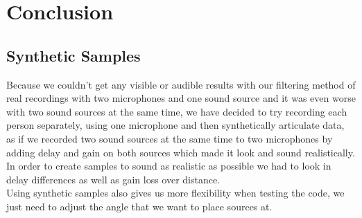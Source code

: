 \chapter{Conclusion}\label{ch:conclusion}

\section{Synthetic Samples}
  Because we couldn't get any visible or audible results with our filtering method of real recordings with two 
microphones and one sound source and it was even worse with two sound sources at the same time, we have 
decided to try recording each person separately, using one microphone and then synthetically articulate data, 
as if we recorded two sound sources at the same time to two microphones by adding delay and gain on both 
sources which made it look and sound realistically.\\
  In order to create samples to sound as realistic as possible we had to look in delay differences as well as 
gain loss over distance. \\
Using synthetic samples also gives us more flexibility when testing the code, we just need to adjust the 
angle that we want to place sources at. 
